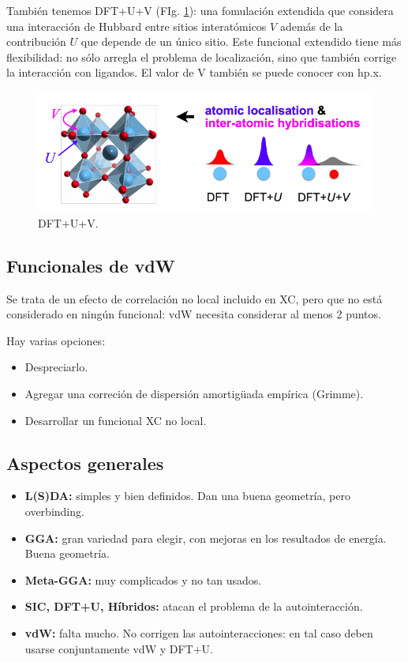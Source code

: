   También tenemos DFT+U+V (FIg. \ref{fig:DFT+U+V}): una fomulación extendida que considera una interacción de Hubbard entre sitios interatómicos $V$ además de la contribución $U$ que depende de un único sitio. Este funcional extendido tiene más flexibilidad: no sólo arregla el problema de localización, sino que también corrige la interacción con ligandos. El valor de V también se puede conocer con hp.x.

  \begin{figure}[H]
      \centering
      \includegraphics[scale = 0.6]{figs/D4/DFT+U+V.png}
      \caption{DFT+U+V.}
      \label{fig:DFT+U+V}
  \end{figure}

\subsection{Funcionales de vdW}

  Se trata de un efecto de correlación no local incluido en XC, pero que no está considerado en ningún funcional: vdW necesita considerar al menos 2 puntos.

  Hay varias opciones:
    \begin{itemize}
      \item Despreciarlo.
      \item Agregar una correción de dispersión amortigüada empírica (Grimme).
      \item Desarrollar un funcional XC no local.
    \end{itemize}

\subsection{Aspectos generales}

  \begin{itemize}
    \item \textbf{L(S)DA:} simples y bien definidos. Dan una buena geometría, pero overbinding.
    \item \textbf{GGA:} gran variedad para elegir, con mejoras en los resultados de energía. Buena geometría.
    \item \textbf{Meta-GGA:} muy complicados y no tan usados.
    \item \textbf{SIC, DFT+U, Híbridos:} atacan el problema de la autointeracción.
    \item \textbf{vdW:} falta mucho. No corrigen las autointeracciones: en tal caso deben usarse conjuntamente vdW y DFT+U.
  \end{itemize}

